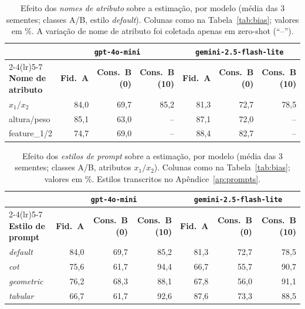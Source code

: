\documentclass[12pt,a4paper]{article}
\begin{document}
\begin{table}[ht]
\centering
\caption{Efeito dos \emph{nomes de atributo} sobre a estimação, por modelo (média das $3$
sementes; classes A/B, estilo \emph{default}). Colunas como na Tabela~\ref{tab:bias};
valores em \%. A variação de nome de atributo foi coletada apenas em zero-shot (``--'').}
\label{tab:bias_feat}
\footnotesize
\setlength{\tabcolsep}{5pt}
\begin{tabular}{lrrrrrr}
\toprule
& \multicolumn{3}{c}{\textbf{\texttt{gpt-4o-mini}}} &
\multicolumn{3}{c}{\textbf{\texttt{gemini-2.5-flash-lite}}} \\
\cmidrule(lr){2-4}\cmidrule(lr){5-7}
\textbf{Nome de atributo} & \textbf{Fid.\ A} & \textbf{Cons.\ B (0)} &
\textbf{Cons.\ B (10)} &
\textbf{Fid.\ A} & \textbf{Cons.\ B (0)} & \textbf{Cons.\ B (10)} \\
\midrule
$x_1/x_2$    & 84,0 & 69,7 & 85,2 & 81,3 & 72,7 & 78,5 \\
altura/peso  & 85,1 & 63,0 & --   & 87,1 & 72,0 & --   \\
feature\_1/2 & 74,7 & 69,0 & --   & 88,4 & 82,7 & --   \\
\bottomrule
\end{tabular}
\end{table}

\begin{table}[ht]
\centering
\caption{Efeito dos \emph{estilos de prompt} sobre a estimação, por modelo (média das $3$
sementes; classes A/B, atributos $x_1/x_2$). Colunas como na Tabela~\ref{tab:bias};
valores em \%. Estilos transcritos no Apêndice~\ref{ap:prompts}.}
\label{tab:bias_prompt}
\footnotesize
\setlength{\tabcolsep}{5pt}
\begin{tabular}{lrrrrrr}
\toprule
& \multicolumn{3}{c}{\textbf{\texttt{gpt-4o-mini}}} &
\multicolumn{3}{c}{\textbf{\texttt{gemini-2.5-flash-lite}}} \\
\cmidrule(lr){2-4}\cmidrule(lr){5-7}
\textbf{Estilo de prompt} & \textbf{Fid.\ A} & \textbf{Cons.\ B (0)} &
\textbf{Cons.\ B (10)} &
\textbf{Fid.\ A} & \textbf{Cons.\ B (0)} & \textbf{Cons.\ B (10)} \\
\midrule
\emph{default}   & 84,0 & 69,7 & 85,2 & 81,3 & 72,7 & 78,5 \\
\emph{cot}       & 75,6 & 61,7 & 94,4 & 66,7 & 55,7 & 90,7 \\
\emph{geometric} & 76,2 & 68,3 & 88,1 & 67,8 & 56,0 & 91,1 \\
\emph{tabular}   & 66,7 & 61,7 & 92,6 & 87,6 & 73,3 & 88,5 \\
\bottomrule
\end{tabular}
\end{table}
\end{document}
